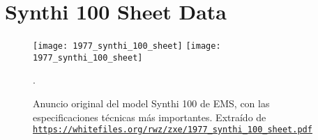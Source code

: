  \chapter[Synthi 100 sheet]{Synthi 100 Sheet Data}



\begin{figure}
	\centering
	\texttt{[image: 1977\_synthi\_100\_sheet]}
	\texttt{[image: 1977\_synthi\_100\_sheet]}
	\caption[EMS Synthi 100 \textit{Data Sheet}]{Anuncio original del model Synthi 100 de EMS, con las especificaciones técnicas más importantes.  Extraído de\\ \href{https://whitefiles.org/rwz/zxe/1977\_synthi\_100\_sheet.pdf}{\texttt{https://whitefiles.org/rwz/zxe/1977\_synthi\_100\_sheet.pdf}}}.
	\label{fig:synthi100_sheet}
\end{figure}



